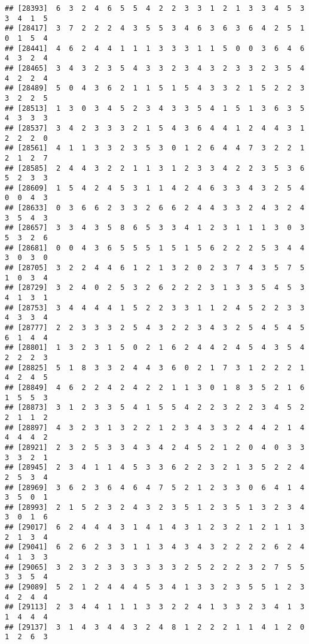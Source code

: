 \documentclass[
]{article}
\begin{document}
\begin{verbatim}
## [28393]  6  3  2  4  6  5  5  4  2  2  3  3  1  2  1  3  3  4  5  3  3  4  1  5
## [28417]  3  7  2  2  2  4  3  5  5  3  4  6  3  6  3  6  4  2  5  1  0  1  5  4
## [28441]  4  6  2  4  4  1  1  1  3  3  3  1  1  5  0  0  3  6  4  6  4  3  2  4
## [28465]  3  4  3  2  3  5  4  3  3  2  3  4  3  2  3  3  2  3  5  4  4  2  2  4
## [28489]  5  0  4  3  6  2  1  1  5  1  5  4  3  3  2  1  5  2  2  3  3  2  2  5
## [28513]  1  3  0  3  4  5  2  3  4  3  3  5  4  1  5  1  3  6  3  5  4  3  3  3
## [28537]  3  4  2  3  3  3  2  1  5  4  3  6  4  4  1  2  4  4  3  1  2  2  2  0
## [28561]  4  1  1  3  3  2  3  5  3  0  1  2  6  4  4  7  3  2  2  1  2  1  2  7
## [28585]  2  4  4  3  2  2  1  1  3  1  2  3  3  4  2  2  3  5  3  6  5  2  3  3
## [28609]  1  5  4  2  4  5  3  1  1  4  2  4  6  3  3  4  3  2  5  4  0  0  4  3
## [28633]  0  3  6  6  2  3  3  2  6  6  2  4  4  3  3  2  4  3  2  4  3  5  4  3
## [28657]  3  3  4  3  5  8  6  5  3  3  4  1  2  3  1  1  1  3  0  3  5  3  2  6
## [28681]  0  0  4  3  6  5  5  5  1  5  1  5  6  2  2  2  5  3  4  4  3  0  3  0
## [28705]  3  2  2  4  4  6  1  2  1  3  2  0  2  3  7  4  3  5  7  5  1  0  3  4
## [28729]  3  2  4  0  2  5  3  2  6  2  2  2  3  1  3  3  5  4  5  3  4  1  3  1
## [28753]  3  4  4  4  4  1  5  2  2  3  3  1  1  2  4  5  2  2  3  3  4  3  3  4
## [28777]  2  2  3  3  3  2  5  4  3  2  2  3  4  3  2  5  4  5  4  5  6  1  4  4
## [28801]  1  3  2  3  1  5  0  2  1  6  2  4  4  2  4  5  4  3  5  4  2  2  2  3
## [28825]  5  1  8  3  3  2  4  4  3  6  0  2  1  7  3  1  2  2  2  1  4  2  4  5
## [28849]  4  6  2  2  4  2  4  2  2  1  1  3  0  1  8  3  5  2  1  6  1  5  5  3
## [28873]  3  1  2  3  3  5  4  1  5  5  4  2  2  3  2  2  3  4  5  2  2  1  1  2
## [28897]  4  3  2  3  1  3  2  2  1  2  3  4  3  3  2  4  4  2  1  4  4  4  4  2
## [28921]  2  3  2  5  3  3  4  3  4  2  4  5  2  1  2  0  4  0  3  3  3  3  2  1
## [28945]  2  3  4  1  1  4  5  3  3  6  2  2  3  2  1  3  5  2  2  4  2  5  3  4
## [28969]  3  6  2  3  6  4  6  4  7  5  2  1  2  3  3  0  6  4  1  4  3  5  0  1
## [28993]  2  1  5  2  3  2  4  3  2  3  5  1  2  3  5  1  3  2  3  4  3  0  1  6
## [29017]  6  2  4  4  4  3  1  4  1  4  3  1  2  3  2  1  2  1  1  3  2  1  3  4
## [29041]  6  2  6  2  3  3  1  1  3  4  3  4  3  2  2  2  2  6  2  4  4  1  3  3
## [29065]  3  2  3  2  3  3  3  3  3  3  2  5  2  2  2  3  2  7  5  5  3  3  5  4
## [29089]  5  2  1  2  4  4  4  5  3  4  1  3  3  2  3  5  5  1  2  3  4  2  4  4
## [29113]  2  3  4  4  1  1  1  3  3  2  2  4  1  3  3  2  3  4  1  3  1  4  4  4
## [29137]  3  1  4  3  4  4  3  2  4  8  1  2  2  2  1  1  4  1  2  0  1  2  6  3

\end{verbatim}
\end{document}
